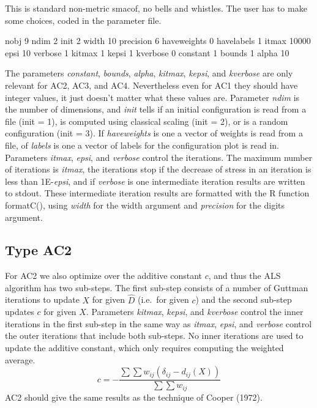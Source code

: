 \documentclass[
  12pt,
]{article}
\newenvironment{Shaded}{\begin{snugshade}}{\end{snugshade}}
\newcommand{\DecValTok}[1]{\textcolor[rgb]{0.00,0.00,0.81}{#1}}
\newcommand{\NormalTok}[1]{#1}
\begin{document}
This is standard non-metric smacof, no bells and whistles. The user has to make some choices,
coded in the parameter file.

\begin{Shaded}
\begin{Highlighting}[]
\NormalTok{nobj   }\DecValTok{9}
\NormalTok{ndim   }\DecValTok{2}
\NormalTok{init   }\DecValTok{2}
\NormalTok{width   }\DecValTok{10}
\NormalTok{precision   }\DecValTok{6}
\NormalTok{haveweights   }\DecValTok{0}
\NormalTok{havelabels }\DecValTok{1}
\NormalTok{itmax   }\DecValTok{10000}
\NormalTok{epsi   }\DecValTok{10}
\NormalTok{verbose   }\DecValTok{1}
\NormalTok{kitmax   }\DecValTok{1}
\NormalTok{kepsi   }\DecValTok{1}
\NormalTok{kverbose   }\DecValTok{0}
\NormalTok{constant }\DecValTok{1}
\NormalTok{bounds }\DecValTok{1}
\NormalTok{alpha }\DecValTok{10}
\end{Highlighting}
\end{Shaded}

The parameters \emph{constant}, \emph{bounds}, \emph{alpha}, \emph{kitmax}, \emph{kepsi}, and \emph{kverbose} are only relevant for AC2, AC3, and AC4. Nevertheless even for AC1 they should have integer values, it just doesn't matter what these values are.
Parameter \emph{ndim} is the number of dimensions, and \emph{init} tells if an initial configuration
is read from a file (init = 1), is computed using classical scaling (init = 2), or is
a random configuration (init = 3). If \emph{haveweights} is one a vector of weights is read from a file, of \emph{labels} is one a vector of labels for the configuration plot is read in. Parameters
\emph{itmax}, \emph{epsi}, and \emph{verbose} control the iterations. The maximum number of iterations
is \emph{itmax}, the iterations stop if the decrease of stress in an iteration is less than
1E-\emph{epsi}, and if \emph{verbose} is one intermediate iteration results are written to stdout.
These intermediate iteration results are formatted with the R function formatC(), using
\emph{width} for the width argument and \emph{precision} for the digits argument.

\subsection{Type AC2}\label{type-ac2}

For AC2 we also optimize over the additive constant \(c\), and thus the ALS algorithm has two
sub-steps. The first sub-step consists of a number of Guttman iterations to update \(X\) for given
\(\hat D\) (i.e.~for given \(c\)) and the second sub-step updates \(c\) for given \(X\).
Parameters \emph{kitmax}, \emph{kepsi}, and \emph{kverbose} control the inner iterations in the first sub-step in the same way as \emph{itmax}, \emph{epsi}, and \emph{verbose} control the
outer iterations that include both sub-steps. No inner iterations are used
to update the additive constant, which only requires computing the weighted
average.
\begin{equation}
c=-\frac{\sum\sum w_{ij}(\delta_{ij}-d_{ij}(X))}{\sum\sum w_{ij}}
\label{eq:updac2}
\end{equation}
AC2 should give the same results as the technique of Cooper (1972).
\end{document}
